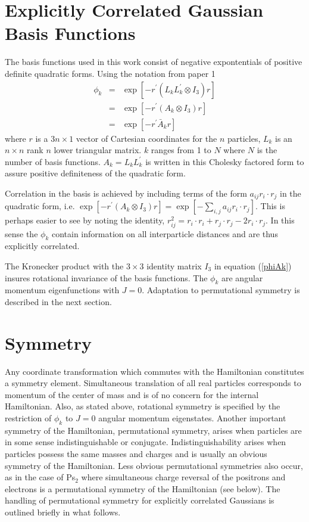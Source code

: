 \documentclass[12pt,thmsa,suthesis,verbatim]{report}
\begin{document}
\section{Explicitly Correlated Gaussian Basis Functions}

The basis functions used in this work consist of negative expontentials of
positive definite quadratic forms. Using the notation from paper 1 
\begin{eqnarray}
\phi _k &=&\exp \left[ -r^{\prime }\left( L_kL_k^{\prime }\otimes I_3\right)
r\right]  \label{phik} \\
&=&\exp \left[ -r^{\prime }\left( A_k\otimes I_3\right) r\right]
\label{phiAk} \\
&=&\exp \left[ -r^{\prime }\bar{A}_kr\right]
\end{eqnarray}
where $r$ is a $3n\times 1$ vector of Cartesian coordinates for the $n$
particles, $L_k$ is an $n\times n$ rank $n$ lower triangular matrix. $k$
ranges from 1 to $N$ where $N$ is the number of basis functions. $%
A_k=L_kL_k^{\prime }$ is written in this Cholesky factored form to assure
positive definiteness of the quadratic form.

Correlation in the basis is achieved by including terms of the form $%
a_{ij}r_i\cdot r_j$ in the quadratic form, i.e. $\exp \left[ -r^{\prime
}\left( A_k\otimes I_3\right) r\right] =\exp \left[
-\sum_{i,j}a_{ij}r_i\cdot r_j\right] $. This is perhaps easier to see by
noting the identity, $r_{ij}^2=r_i\cdot r_i+r_j\cdot r_j-2r_i\cdot r_j$. In
this sense the $\phi _k$ contain information on all interparticle distances
and are thus explicitly correlated.

The Kronecker product with the $3\times 3$ identity matrix $I_3$ in equation
(\ref{phiAk}) insures rotational invariance of the basis functions. The $%
\phi _k$ are angular momentum eigenfunctions with $J=0$. Adaptation to
permutational symmetry is described in the next section.

\section{Symmetry}

Any coordinate transformation which commutes with the Hamiltonian
constitutes a symmetry element. Simultaneous translation of all real
particles corresponds to momentum of the center of mass and is of no concern
for the internal Hamiltonian. Also, as stated above, rotational symmetry is
specified by the restriction of $\phi _k$ to $J=0$ angular momentum
eigenstates. Another important symmetry of the Hamiltonian, permutational
symmetry, arises when particles are in some sense indistinguishable or
conjugate. Indistinguishability arises when particles possess the same
masses and charges and is usually an obvious symmetry of the Hamiltonian.
Less obvious permutational symmetries also occur, as in the case of Ps$_2$
where simultaneous charge reversal of the positrons and electrons is a
permutational symmetry of the Hamiltonian (see below). The handling of
permutational symmetry for explicitly correlated Gaussians is outlined
briefly in what follows.
\end{document}
